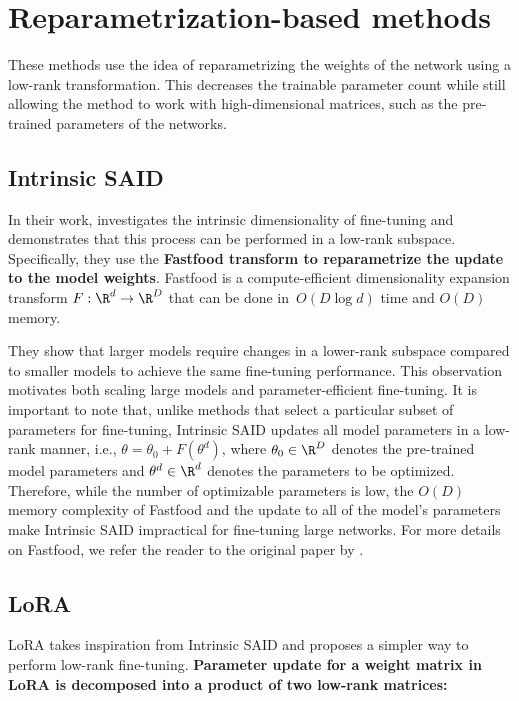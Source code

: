 \section{Reparametrization-based methods}
\label{sec:reparametrization_based_methods}

These methods use the idea of reparametrizing the weights of the network using a low-rank transformation. This decreases the trainable parameter count while still allowing the method to work with high-dimensional matrices, such as the pre-trained parameters of the networks.

\subsection{Intrinsic SAID}
\label{sec:intrinsic_said}

In their work, \citet{intrinsic_said} investigates the intrinsic dimensionality of fine-tuning and demonstrates that this process can be performed in a low-rank subspace. Specifically, they use the \textbf{Fastfood transform to reparametrize the update to the model weights}. Fastfood is a compute-efficient dimensionality expansion transform $F:\R^d \rightarrow \R^D$ that can be done in~$O(D \log d)$ time and $O(D)$ memory.

They show that larger models require changes in a lower-rank subspace compared to smaller models to achieve the same fine-tuning performance. This observation motivates both scaling large models and parameter-efficient fine-tuning. It is important to note that, unlike methods that select a particular subset of parameters for fine-tuning, Intrinsic SAID updates all model parameters in a low-rank manner, i.e., $\theta = \theta_0 + F(\theta^d)$, where $\theta_0 \in \R^D$ denotes the pre-trained model parameters and $\theta^d \in \R^d$ denotes the parameters to be optimized. Therefore, while the number of optimizable parameters is low, the $O(D)$ memory complexity of Fastfood and the update to all of the model's parameters make Intrinsic SAID impractical for fine-tuning large networks. For more details on Fastfood, we refer the reader to the original paper by \citet{Le2013FastfoodAK}.

\subsection{LoRA}
\label{sec:lora}

LoRA \citep{lora} takes inspiration from Intrinsic SAID and proposes a simpler way to perform low-rank fine-tuning. \textbf{Parameter update for a weight matrix in LoRA is decomposed into a product of two low-rank matrices:}

